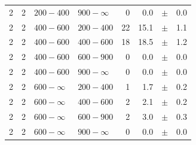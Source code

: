 \begin{table}[!t]
\begin{tabular}{rrllrrcl}
2 & 2 & $ 200- 400$ & $900-\infty$ &      0 &      0.0 &$\pm$&    0.0 \\
2 & 2 & $ 400- 600$ & $200-400$ &     22 &     15.1 &$\pm$&    1.1 \\
2 & 2 & $ 400- 600$ & $400-600$ &     18 &     18.5 &$\pm$&    1.2 \\
2 & 2 & $ 400- 600$ & $600-900$ &      0 &      0.0 &$\pm$&    0.0 \\
2 & 2 & $ 400- 600$ & $900-\infty$ &      0 &      0.0 &$\pm$&    0.0 \\
2 & 2 & $ 600- \infty$ & $200-400$ &      1 &      1.7 &$\pm$&    0.2 \\
2 & 2 & $ 600- \infty$ & $400-600$ &      2 &      2.1 &$\pm$&    0.2 \\
2 & 2 & $ 600- \infty$ & $600-900$ &      2 &      3.0 &$\pm$&    0.3 \\
2 & 2 & $ 600- \infty$ & $900-\infty$ &      0 &      0.0 &$\pm$&    0.0 \\
    \hline
  \end{tabular}
\end{table}

